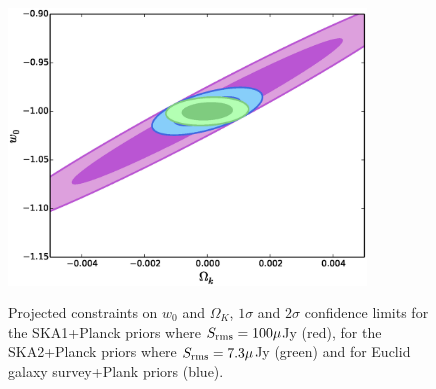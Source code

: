 \documentclass[useAMS,usenatbib]{mn2e}
\begin{document}
\begin{figure}
\begin{center}
\includegraphics[height=8.0cm,width=9.5cm]{plots/output_ellipse_w0_OK_14bins.eps} 
\caption{Projected constraints on  $w_0$ and $\Omega_K$, $1 \sigma$ and $2\sigma$ confidence limits  for the SKA1+Planck priors where  $S_{\rm rms} = 100 \mu $Jy (red), for the SKA2+Planck priors where  $S_{\rm rms} = 7.3 \mu $Jy (green) and  for Euclid galaxy survey+Plank priors (blue).}
\label{Fig:w_ok}
\end{center}
\end{figure}

\end{document}
